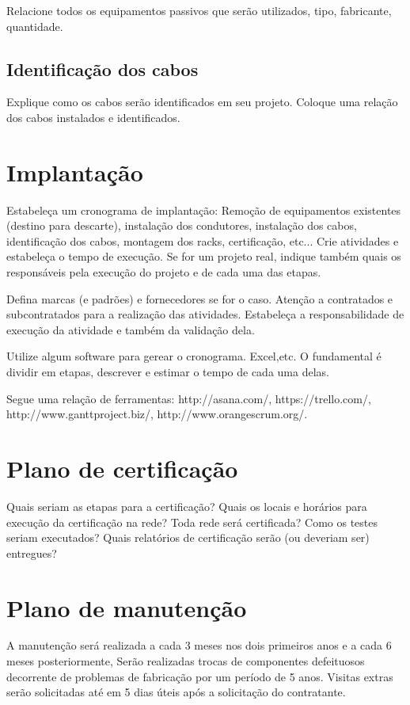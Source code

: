 \documentclass[	DIV=calc,%
							paper=a4,%
							fontsize=12pt,%
							onecolumn]{scrartcl}	 					%
\begin{document}
Relacione todos os equipamentos passivos que serão utilizados, tipo, fabricante, quantidade.

\subsection{Identificação dos cabos}
Explique como os cabos serão identificados em seu projeto. Coloque uma relação dos cabos instalados e identificados.

\section{Implantação}
Estabeleça um cronograma de implantação:
Remoção de equipamentos existentes (destino para descarte), instalação dos condutores, instalação dos cabos, 
identificação dos cabos, montagem dos racks, certificação, etc... Crie atividades e estabeleça o tempo de execução. Se for um projeto real, indique também quais os responsáveis pela execução do projeto e de cada uma das etapas.

Defina marcas (e padrões) e fornecedores se for o caso. Atenção a contratados e subcontratados para a realização das atividades. Estabeleça a responsabilidade de execução da atividade e também da validação dela.

Utilize algum software para gerear o cronograma. Excel,etc. O fundamental é dividir em etapas, descrever e estimar o tempo de cada uma delas.

Segue uma relação de ferramentas:
http://asana.com/, 
https://trello.com/, 
http://www.ganttproject.biz/, 
http://www.orangescrum.org/. 

\section{Plano de certificação}
Quais seriam as etapas para a certificação? 
Quais os locais e horários para execução da certificação na rede? Toda rede será certificada?
Como os testes seriam executados?
Quais relatórios de certificação serão (ou deveriam ser) entregues? 

\section{Plano de manutenção}

A manutenção será realizada a cada 3 meses nos dois primeiros anos e a cada 6 meses posteriormente, Serão realizadas trocas de componentes defeituosos decorrente de problemas de fabricação por um período de 5 anos. Visitas extras serão solicitadas até em 5 dias úteis após a solicitação do contratante.
\end{document}
